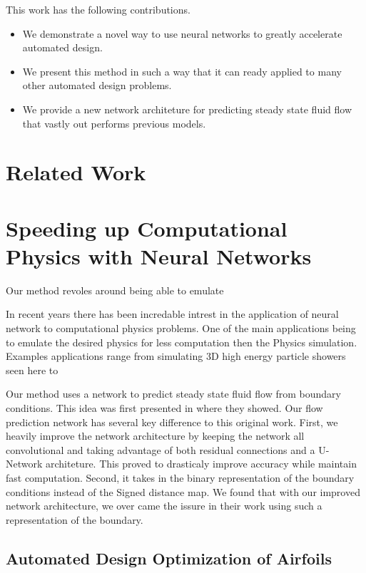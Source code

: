 \documentclass{article} %
\begin{document}
This work has the following contributions.
\begin{itemize}
  \item We demonstrate a novel way to use neural networks to greatly accelerate automated design.
  \item We present this method in such a way that it can ready applied to many other automated design problems.
  \item We provide a new network architeture for predicting steady state fluid flow that vastly out performs previous models.
\end{itemize}

\section{Related Work}



\section{Speeding up Computational Physics with Neural Networks}

Our method revoles around being able to emulate 

In recent years there has been incredable intrest in the application of neural network to computational physics problems. One of the main applications being to emulate the desired physics for less computation then the Physics simulation. Examples applications range from simulating 3D high energy particle showers seen here to 

Our method uses a network to predict steady state fluid flow from boundary conditions. This idea was first presented in \citep{guo2016convolutional} where they showed. Our flow prediction network has several key difference to this original work. First, we heavily improve the network architecture by keeping the network all convolutional and taking advantage of both residual connections and a U-Network architeture. This proved to drasticaly improve accuracy while maintain fast computation. Second, it takes in the binary representation of the boundary conditions instead of the Signed distance map. We found that with our improved network architecture, we over came the issure in their work using such a representation of the boundary.

\subsection{Automated Design Optimization of Airfoils}
\end{document}
